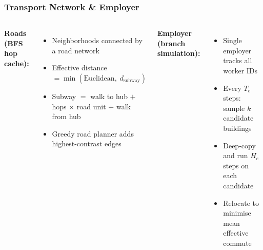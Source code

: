 \documentclass{beamer}
\begin{document}
\begin{frame}
  \frametitle{Transport Network \& Employer}
  \begin{columns}
    \textbf{Roads (BFS hop cache):}
    \begin{itemize}
      \small
      \item Neighborhoods connected by a road network
      \item Effective distance $= \min(\text{Euclidean},\; d_{\text{subway}})$
      \item Subway $= $ walk to hub $+$ hops $\times$ road unit $+$ walk from hub
      \item Greedy road planner adds highest-contrast edges
    \end{itemize}
    \textbf{Employer (branch simulation):}
    \begin{itemize}
      \small
      \item Single employer tracks all worker IDs
      \item Every $T_e$ steps: sample $k$ candidate buildings
      \item Deep-copy and run $H_e$ steps on each candidate
      \item Relocate to minimise mean effective commute
    \end{itemize}
  \end{columns}
  \vspace{0.5em}
  \begin{center}
  \end{center}
\end{frame}
\end{document}
